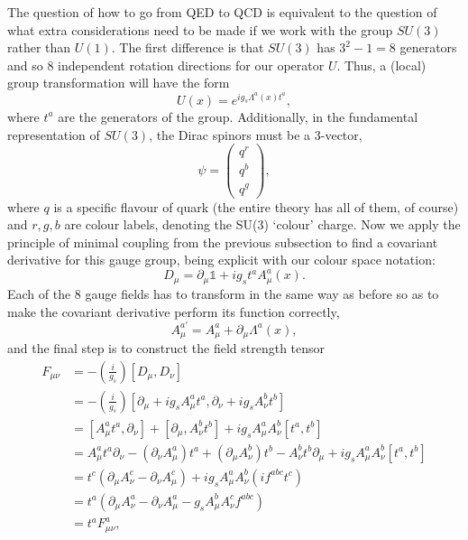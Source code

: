 The question of how to go from QED to QCD is equivalent to the question of what extra considerations need to be made if we work with the group $SU(3)$ rather than $U(1)$. The first difference is that $SU(3)$ has $3^2 - 1 = 8$ generators and so 8 independent rotation directions for our operator $U$. Thus, a (local) group transformation will have the form
\begin{equation}
U(x) = e^{i g_s \Lambda^a(x)t^a},
\end{equation}
where $t^a$ are the generators of the group. Additionally, in the fundamental representation of $SU(3)$, the Dirac spinors must be a 3-vector,
\begin{equation}
\psi = \begin{pmatrix}
    q^r \\
    q^b \\
    q^g
\end{pmatrix} ,
\end{equation}
where $q$ is a specific flavour of quark (the entire theory has all of them, of course) and $r,g,b$ are colour labels, denoting the SU(3) `colour' charge. Now we apply the principle of minimal coupling from the previous subsection to find a covariant derivative for this gauge group, being explicit with our colour space notation:
\begin{equation}
D_\mu = \partial_\mu \mathbb{1} + i g_s t^a A^a_\mu(x).
\end{equation}
Each of the 8 gauge fields has to transform in the same way as before so as to make the covariant derivative perform its function correctly,
\begin{equation}
A_\mu^{a'} = A^a_\mu + \partial_\mu \Lambda^a(x),
\end{equation}
and the final step is to construct the field strength tensor
\begin{equation}
\begin{split}
F_{\mu \nu} &= -\left(\frac{i}{g_s}\right) [D_\mu, D_\nu] \\
& =-\left(\frac{i}{g_s}\right) [\partial_\mu + i g_s A_\mu^a t^a, \partial_\nu + i g_s A_\nu^b t^b] \\
&= [A_\mu^a t^a, \partial_\nu] + [\partial_\mu, A_\nu^b t^b] + i g_s A^a_\mu A_\nu^b[t^a, t^b] \\
&= A^a_\mu t^a \partial_\nu - (\partial_\nu A_\mu^a) t^a + (\partial_\mu A_\nu^b) t^b - A_\nu^b t^b \partial_\mu + i g_s A^a_\mu A_\nu^b [t^a, t^b] \\
&= t^c( \partial_\mu A_\nu^c - \partial_\nu A_\mu^c) + i g_s A_\mu^a A_\nu^b (i f^{abc}t^c) \\
&= t^a( \partial_\mu A_\nu^a - \partial_\nu A_\mu^a - g_s A_\mu^b A_\nu^c f^{abc}) \\
&= t^a F_{\mu \nu}^a,
\end{split}
\end{equation}
